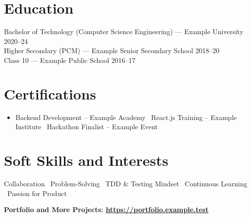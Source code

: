 \documentclass[a4paper,11pt]{article}
\begin{document}
\section*{Education}

Bachelor of Technology (Computer Science Engineering) --- Example University \hfill 2020--24 \\
Higher Secondary (PCM) --- Example Senior Secondary School \hfill 2018--20 \\
Class 10 --- Example Public School \hfill 2016--17

\section*{Certifications}

\begin{itemize}[label=--, leftmargin=*]
    \item Backend Development -- Example Academy \textbullet\ React.js Training -- Example Institute \textbullet\ Hackathon Finalist -- Example Event
\end{itemize}

\section*{Soft Skills and Interests}

Collaboration \textbullet\ Problem-Solving \textbullet\ TDD \& Testing Mindset \textbullet\ Continuous Learning \textbullet\ Passion for Product

\vspace{6pt}
\begin{center}
    \textbf{Portfolio and More Projects: \href{https://portfolio.example.test}{https://portfolio.example.test}}
\end{center}
\end{document}
